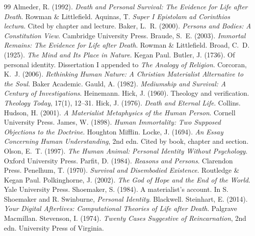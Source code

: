 \documentclass{situationist-preprint}
\begin{document}
\begin{thebibliography}{99}\small
{} Almeder, R. (1992). \emph{Death and Personal Survival: The Evidence for Life after Death}. Rowman \& Littlefield.
 Aquinas, T. \emph{Super I Epistolam ad Corinthios lectura}. Cited by chapter and lecture.
 Baker, L.~R. (2000). \emph{Persons and Bodies: A Constitution View}. Cambridge University Press.
 Braude, S.~E. (2003). \emph{Immortal Remains: The Evidence for Life after Death}. Rowman \& Littlefield.
 Broad, C.~D. (1925). \emph{The Mind and Its Place in Nature}. Kegan Paul.
 Butler, J. (1736). Of personal identity. Dissertation I appended to \emph{The Analogy of Religion}.
 Corcoran, K.~J. (2006). \emph{Rethinking Human Nature: A Christian Materialist Alternative to the Soul}. Baker Academic.
 Gauld, A. (1982). \emph{Mediumship and Survival: A Century of Investigations}. Heinemann.
 Hick, J. (1960). Theology and verification. \emph{Theology Today}, 17(1), 12--31.
 Hick, J. (1976). \emph{Death and Eternal Life}. Collins.
 Hudson, H. (2001). \emph{A Materialist Metaphysics of the Human Person}. Cornell University Press.
 James, W. (1898). \emph{Human Immortality: Two Supposed Objections to the Doctrine}. Houghton Mifflin.
 Locke, J. (1694). \emph{An Essay Concerning Human Understanding}, 2nd edn. Cited by book, chapter and section.
 Olson, E.~T. (1997). \emph{The Human Animal: Personal Identity Without Psychology}. Oxford University Press.
 Parfit, D. (1984). \emph{Reasons and Persons}. Clarendon Press.
 Penelhum, T. (1970). \emph{Survival and Disembodied Existence}. Routledge \& Kegan Paul.
 Polkinghorne, J. (2002). \emph{The God of Hope and the End of the World}. Yale University Press.
 Shoemaker, S. (1984). A materialist's account. In S. Shoemaker and R. Swinburne, \emph{Personal Identity}. Blackwell.
 Steinhart, E. (2014). \emph{Your Digital Afterlives: Computational Theories of Life after Death}. Palgrave Macmillan.
 Stevenson, I. (1974). \emph{Twenty Cases Suggestive of Reincarnation}, 2nd edn. University Press of Virginia.

\end{thebibliography}
\end{document}
